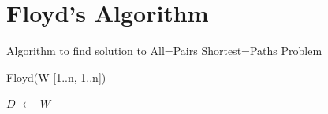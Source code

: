 \documentclass[]{report}
\begin{document}
\section*{Floyd’s Algorithm}
Algorithm to find solution to All=Pairs Shortest=Paths Problem
\vspace{1cm}
\begin{algorithm}[H]
\caption{Floyd(W [1..n, 1..n])}
\SetAlgoLined
\DontPrintSemicolon
\KwIn{]}
\KwOut{]}
$D$ $\gets$ $W$ \Comment*[r]{}
\;
\end{algorithm}
\end{document}
